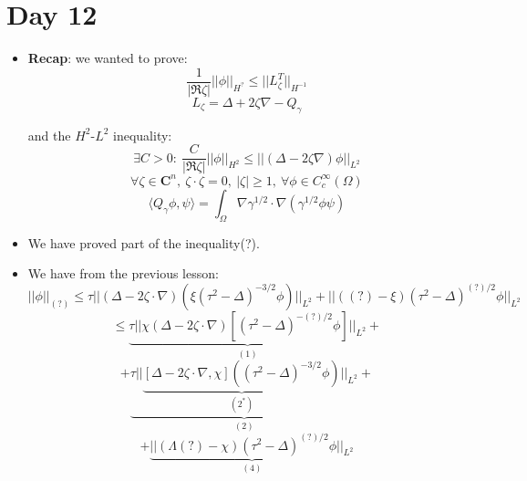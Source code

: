 \documentclass{article}
\begin{document}
\section*{Day 12}
\begin{itemize}
    \item \textbf{Recap}: we wanted to prove:
    \begin{equation}
        \frac{1}{|\Re \zeta |} || \phi||_{H^?} \leq || L_\zeta^T||_{H^{-1}}
    \end{equation}
    \begin{equation}
        L_\zeta = \Delta + 2 \zeta \nabla - Q_\gamma
    \end{equation}
    
    and the $H^2$-$L^2$ inequality:
    \begin{equation}
        \exists C > 0: \ \frac{C}{|\Re \zeta|} || \phi ||_{H^2} \leq || (\Delta - 2 \zeta \nabla)\phi||_{L^2}
    \end{equation}
    \begin{equation}
        \forall \zeta \in \mathbf{C}^n, \ \zeta \cdot \zeta = 0, \ |\zeta| \geq 1, \ \forall \phi \in C^\infty_c (\Omega)
    \end{equation}
    \begin{equation}
        \langle  Q_\gamma \phi, \psi \rangle = \int_\Omega \nabla \gamma^{1/2} \cdot \nabla (\gamma^{1/2} \phi \psi)
    \end{equation}
    
    \item We have proved part of the inequality(?).

    \item We have from the previous lesson:
    \begin{equation}
        ||\phi||_{(?)} \leq \tau || (\Delta - 2\zeta \cdot \nabla) (\xi (\tau^2 - \Delta)^{-3/2} \phi) ||_{L^2} + || ((?) - \xi)(\tau^2 - \Delta)^{(?)/2}\phi||_{L^2}
    \end{equation}
    \begin{equation}
        \leq \underbrace{\tau || \chi(\Delta - 2 \zeta \cdot \nabla) [(\tau^2 - \Delta)^{-(?)/2} \phi]||_{L^2} }_{(1)} +
    \end{equation}
    \begin{equation}
        +  \underbrace{\tau ||  \underbrace{[\Delta - 2 \zeta \cdot \nabla, \chi] ((\tau^2 - \Delta)^{-3/2} \phi)}_{(2^*)}  ||_{L^2}}_{(2)}+
    \end{equation}
    \begin{equation}
        + \underbrace{|| (\Lambda(?) - \chi) (\tau^2 - \Delta)^{(?)/2} \phi ||_{L^2}}_{(4)} 
    \end{equation}


\end{itemize}
\end{document}
